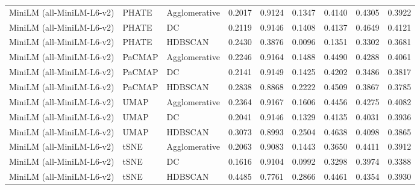 \begin{table}[t]
\begin{tabular}{lllcccccc}
MiniLM (all-MiniLM-L6-v2) & PHATE & Agglomerative & 0.2017 & 0.9124 & 0.1347 & 0.4140 & 0.4305 & 0.3922 \\
MiniLM (all-MiniLM-L6-v2) & PHATE & DC & 0.2119 & 0.9146 & 0.1408 & 0.4137 & 0.4649 & 0.4121 \\
MiniLM (all-MiniLM-L6-v2) & PHATE & HDBSCAN & 0.2430 & 0.3876 & 0.0096 & 0.1351 & 0.3302 & 0.3681 \\

MiniLM (all-MiniLM-L6-v2) & PaCMAP & Agglomerative & 0.2246 & 0.9164 & 0.1488 & 0.4490 & 0.4288 & 0.4061 \\
MiniLM (all-MiniLM-L6-v2) & PaCMAP & DC & 0.2141 & 0.9149 & 0.1425 & 0.4202 & 0.3486 & 0.3817 \\
MiniLM (all-MiniLM-L6-v2) & PaCMAP & HDBSCAN & 0.2838 & 0.8868 & 0.2222 & 0.4509 & 0.3867 & 0.3785 \\

MiniLM (all-MiniLM-L6-v2) & UMAP & Agglomerative & 0.2364 & 0.9167 & 0.1606 & 0.4456 & 0.4275 & 0.4082 \\
MiniLM (all-MiniLM-L6-v2) & UMAP & DC & 0.2041 & 0.9146 & 0.1329 & 0.4135 & 0.4031 & 0.3936 \\
MiniLM (all-MiniLM-L6-v2) & UMAP & HDBSCAN & 0.3073 & 0.8993 & 0.2504 & 0.4638 & 0.4098 & 0.3865 \\

MiniLM (all-MiniLM-L6-v2) & tSNE & Agglomerative & 0.2063 & 0.9083 & 0.1443 & 0.3650 & 0.4411 & 0.3912 \\
MiniLM (all-MiniLM-L6-v2) & tSNE & DC & 0.1616 & 0.9104 & 0.0992 & 0.3298 & 0.3974 & 0.3388 \\
MiniLM (all-MiniLM-L6-v2) & tSNE & HDBSCAN & 0.4485 & 0.7761 & 0.2866 & 0.4461 & 0.4354 & 0.3930 \\
\bottomrule
\end{tabular}
\end{table}
